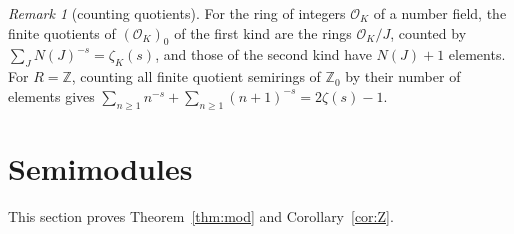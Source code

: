 \documentclass[11pt]{amsart}
\theoremstyle{remark}
\newtheorem{remark}[thm]{Remark}
\begin{document}
\begin{remark}[counting quotients]
For the ring of integers $\mathcal O_K$ of a number field, the finite quotients of $(\mathcal O_K)_0$ of the first kind are the rings $\mathcal O_K/J$, counted by $\sum_JN(J)^{-s}=\zeta_K(s)$, and those of the second kind have $N(J)+1$ elements. For $R=\mathbb Z$, counting all finite quotient semirings of $\mathbb Z_0$ by their number of elements gives $\sum_{n\ge1}n^{-s}+\sum_{n\ge1}(n+1)^{-s}=2\zeta(s)-1$.
\end{remark}

\section{Semimodules}\label{sec:mod}

This section proves Theorem~\ref{thm:mod} and Corollary~\ref{cor:Z}.
\end{document}

